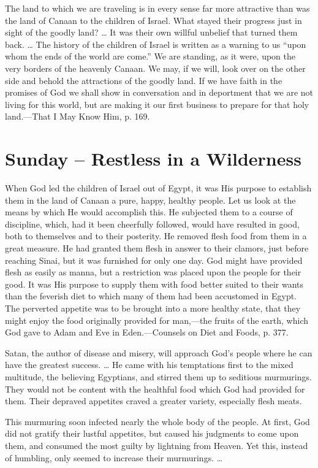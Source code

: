 \documentclass[a4paper, 10pt, twoside, headings=small]{scrartcl}
\begin{document}
\begin{multicols}{2}
The land to which we are traveling is in every sense far more attractive than was the land of Canaan to the children of Israel. What stayed their progress just in sight of the goodly land? … It was their own willful unbelief that turned them back. … The history of the children of Israel is written as a warning to us “upon whom the ends of the world are come.” We are standing, as it were, upon the very borders of the heavenly Canaan. We may, if we will, look over on the other side and behold the attractions of the goodly land. If we have faith in the promises of God we shall show in conversation and in deportment that we are not living for this world, but are making it our first business to prepare for that holy land.—That I May Know Him, p. 169.

\section*{Sunday – Restless in a Wilderness}

When God led the children of Israel out of Egypt, it was His purpose to establish them in the land of Canaan a pure, happy, healthy people. Let us look at the means by which He would accomplish this. He subjected them to a course of discipline, which, had it been cheerfully followed, would have resulted in good, both to themselves and to their posterity. He removed flesh food from them in a great measure. He had granted them flesh in answer to their clamors, just before reaching Sinai, but it was furnished for only one day. God might have provided flesh as easily as manna, but a restriction was placed upon the people for their good. It was His purpose to supply them with food better suited to their wants than the feverish diet to which many of them had been accustomed in Egypt. The perverted appetite was to be brought into a more healthy state, that they might enjoy the food originally provided for man,—the fruits of the earth, which God gave to Adam and Eve in Eden.—Counsels on Diet and Foods, p. 377.

Satan, the author of disease and misery, will approach God’s people where he can have the greatest success. … He came with his temptations first to the mixed multitude, the believing Egyptians, and stirred them up to seditious murmurings. They would not be content with the healthful food which God had provided for them. Their depraved appetites craved a greater variety, especially flesh meats.

This murmuring soon infected nearly the whole body of the people. At first, God did not gratify their lustful appetites, but caused his judgments to come upon them, and consumed the most guilty by lightning from Heaven. Yet this, instead of humbling, only seemed to increase their murmurings. …


\end{multicols}
\end{document}
